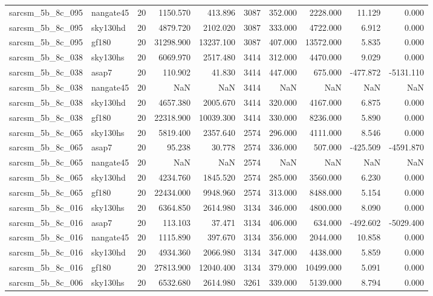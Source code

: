 \documentclass{article}
\begin{document}
\begin{longtable}{llrrrrrrrr}
sarcsm\_5b\_8c\_095 & nangate45 & 20 & 1150.570 & 413.896 & 3087 & 352.000 & 2228.000 & 11.129 & 0.000 \\
sarcsm\_5b\_8c\_095 & sky130hd & 20 & 4879.720 & 2102.020 & 3087 & 333.000 & 4722.000 & 6.912 & 0.000 \\
sarcsm\_5b\_8c\_095 & gf180 & 20 & 31298.900 & 13237.100 & 3087 & 407.000 & 13572.000 & 5.835 & 0.000 \\
sarcsm\_5b\_8c\_038 & sky130hs & 20 & 6069.970 & 2517.480 & 3414 & 312.000 & 4470.000 & 9.029 & 0.000 \\
sarcsm\_5b\_8c\_038 & asap7 & 20 & 110.902 & 41.830 & 3414 & 447.000 & 675.000 & -477.872 & -5131.110 \\
sarcsm\_5b\_8c\_038 & nangate45 & 20 & NaN & NaN & 3414 & NaN & NaN & NaN & NaN \\
sarcsm\_5b\_8c\_038 & sky130hd & 20 & 4657.380 & 2005.670 & 3414 & 320.000 & 4167.000 & 6.875 & 0.000 \\
sarcsm\_5b\_8c\_038 & gf180 & 20 & 22318.900 & 10039.300 & 3414 & 330.000 & 8236.000 & 5.890 & 0.000 \\
sarcsm\_5b\_8c\_065 & sky130hs & 20 & 5819.400 & 2357.640 & 2574 & 296.000 & 4111.000 & 8.546 & 0.000 \\
sarcsm\_5b\_8c\_065 & asap7 & 20 & 95.238 & 30.778 & 2574 & 336.000 & 507.000 & -425.509 & -4591.870 \\
sarcsm\_5b\_8c\_065 & nangate45 & 20 & NaN & NaN & 2574 & NaN & NaN & NaN & NaN \\
sarcsm\_5b\_8c\_065 & sky130hd & 20 & 4234.760 & 1845.520 & 2574 & 285.000 & 3560.000 & 6.230 & 0.000 \\
sarcsm\_5b\_8c\_065 & gf180 & 20 & 22434.000 & 9948.960 & 2574 & 313.000 & 8488.000 & 5.154 & 0.000 \\
sarcsm\_5b\_8c\_016 & sky130hs & 20 & 6364.850 & 2614.980 & 3134 & 346.000 & 4800.000 & 8.090 & 0.000 \\
sarcsm\_5b\_8c\_016 & asap7 & 20 & 113.103 & 37.471 & 3134 & 406.000 & 634.000 & -492.602 & -5029.400 \\
sarcsm\_5b\_8c\_016 & nangate45 & 20 & 1115.890 & 397.670 & 3134 & 356.000 & 2044.000 & 10.858 & 0.000 \\
sarcsm\_5b\_8c\_016 & sky130hd & 20 & 4934.360 & 2066.980 & 3134 & 347.000 & 4438.000 & 5.859 & 0.000 \\
sarcsm\_5b\_8c\_016 & gf180 & 20 & 27813.900 & 12040.400 & 3134 & 379.000 & 10499.000 & 5.091 & 0.000 \\
sarcsm\_5b\_8c\_006 & sky130hs & 20 & 6532.680 & 2614.980 & 3261 & 339.000 & 5139.000 & 8.794 & 0.000 \\

\end{longtable}
\end{document}
